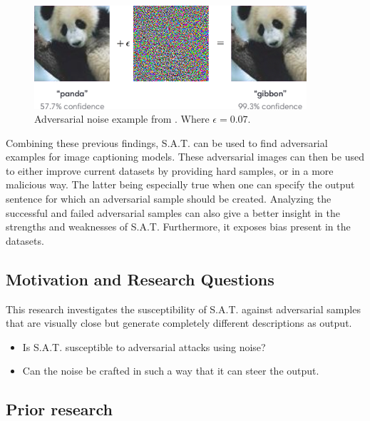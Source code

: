 \begin{figure}[h]
    \centering
    \includegraphics[width=0.9\textwidth]{figures/adversarial_img_1.png}
    \caption{Adversarial noise example from \protect\cite{goodfellow2015explaining}. Where $\epsilon=0.07$.}
    \label{adv_gibbon}
\end{figure}

Combining these previous findings, S.A.T. can be used to find adversarial examples for image captioning models. These adversarial images can then be used to either improve current datasets by providing hard samples, or in a more malicious way. The latter being especially true when one can specify the output sentence for which an adversarial sample should be created.
Analyzing the successful and failed adversarial samples can also give a better insight in the strengths and weaknesses of S.A.T. Furthermore, it exposes bias present in the datasets.

\subsection{Motivation and Research Questions}
This research investigates the susceptibility of S.A.T. against adversarial samples that are visually close but generate completely different descriptions as output.
\begin{itemize}
    \item Is S.A.T. susceptible to adversarial attacks using noise?
    \item Can the noise be crafted in such a way that it can steer the output.
\end{itemize}

\subsection{Prior research}

